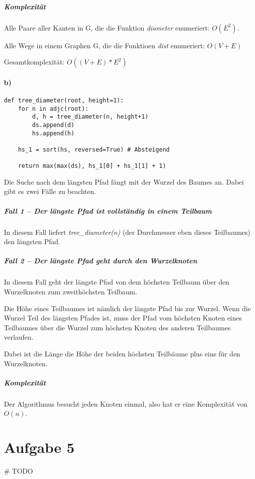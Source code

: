 \documentclass[a4paper,10pt]{scrartcl}
\begin{document}
\subparagraph{Komplexität}

Alle Paare aller Kanten in G, die die Funktion \emph{diameter} enumeriert: $O(E^2)$.

Alle Wege in einem Graphen G, die die Funktioen \emph{dist} enumeriert: $O(V+E)$

Gesamtkomplexität: $O((V+E)*E^2)$

\paragraph{b)}

\begin{verbatim}
def tree_diameter(root, height=1):
    for n in adjc(root):
        d, h = tree_diameter(n, height+1)
        ds.append(d)
        hs.append(h)

    hs_1 = sort(hs, reversed=True) # Absteigend

    return max(max(ds), hs_1[0] + hs_1[1] + 1)
\end{verbatim}

Die Suche nach dem längsten Pfad fängt mit der Wurzel des Baumes an.
Dabei gibt es zwei Fälle zu beachten.

\subparagraph{Fall 1 -- Der längste Pfad ist vollständig in einem Teilbaum}

In diesem Fall liefert \emph{tree\_diameter(n)} (der Durchmesser eben dieses Teilbaumes) den längsten Pfad.

\subparagraph{Fall 2 -- Der längste Pfad geht durch den Wurzelknoten}

In diesem Fall geht der längste Pfad von dem höchsten Teilbaum über den Wurzelknoten zum zweithöchsten Teilbaum.

Die Höhe eines Teilbaumes ist nämlich der längste Pfad bis zur Wurzel.
Wenn die Wurzel Teil des längsten Pfades ist, muss der Pfad vom höchsten Knoten eines Teilbaumes über die Wurzel
zum höchsten Knoten des anderen Teilbaumes verlaufen.

Dabei ist die Länge die Höhe der beiden höchsten Teilbäume plus eins für den Wurzelknoten.

\subparagraph{Komplexität}

Der Algorithmus besucht jeden Knoten einmal, also hat er eine Komplexität von $O(n)$.

\section*{Aufgabe 5}

\# TODO
\end{document}
